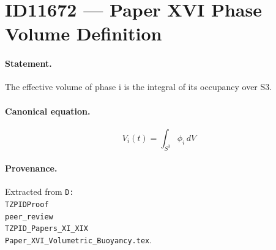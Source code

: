 \section*{ID11672 --- Paper XVI Phase Volume Definition}

\paragraph{Statement.}
The effective volume of phase i is the integral of its occupancy over S3.

\paragraph{Canonical equation.}
\[
V_i(t)=\int_{S^3}\phi_i\,dV
\]

\paragraph{Provenance.}
Extracted from \texttt{D:\\TZPIDProof\\peer\_review\\TZPID\_Papers\_XI\_XIX\\Paper\_XVI\_Volumetric\_Buoyancy.tex}.
